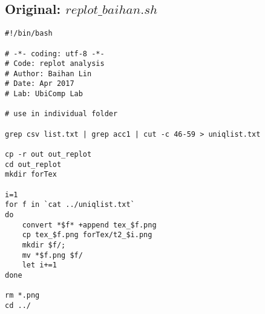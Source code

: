 \documentclass{sigchi}
\begin{document}
\subsection{Original: $replot\_baihan.sh$}\label{ss:replot}
\begin{lstlisting}
#!/bin/bash

# -*- coding: utf-8 -*-
# Code: replot analysis
# Author: Baihan Lin
# Date: Apr 2017
# Lab: UbiComp Lab

# use in individual folder

grep csv list.txt | grep acc1 | cut -c 46-59 > uniqlist.txt

cp -r out out_replot
cd out_replot
mkdir forTex

i=1
for f in `cat ../uniqlist.txt`
do
	convert *$f* +append tex_$f.png
	cp tex_$f.png forTex/t2_$i.png
	mkdir $f/;
	mv *$f.png $f/
	let i+=1
done

rm *.png
cd ../
\end{lstlisting}
\end{document}
